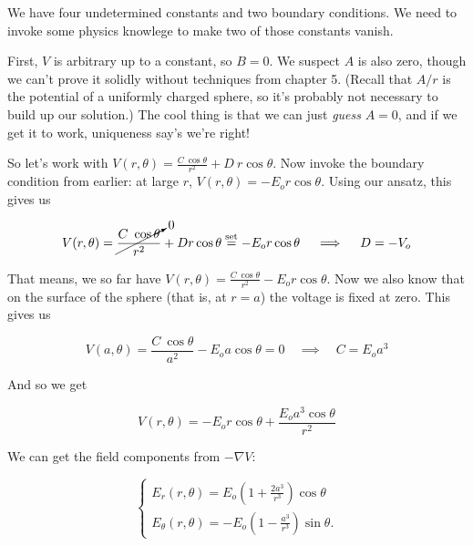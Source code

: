 \documentclass{article}
\begin{document}
\vspace{2em}

We have four undetermined constants and two boundary conditions. We need to invoke some physics knowlege to make two of those constants vanish.

\vspace{1em}

First, $V$ is arbitrary up to a constant, so $B=0$. We suspect $A$ is also zero, though we can't prove it solidly without techniques from chapter 5. (Recall that $A/r$ is the potential of a uniformly charged sphere, so it's probably not necessary to build up our solution.) The cool thing is that we can just \emph{guess} $A=0$, and if we get it to work, uniqueness say's we're right!

\vspace{1em}

So let's work with $\displaystyle V(r,\theta) = \frac{C\ \cos{\theta}}{r^2} + D\ r\cos{\theta}$. Now invoke the boundary condition from earlier: at large $r$, $V(r,\theta) = -E_o r\cos{\theta}$. Using our ansatz, this gives us

\begin{equation*}
    V(r,\theta) = \cancelto{0}{\frac{C\ \cos{\theta}}{r^2}} + D r\cos{\theta} \overset{\text{set}}{=} -E_o r\cos{\theta} \quad \implies \quad D = -V_o
\end{equation*}

That means, we so far have $\displaystyle V(r,\theta) = \frac{C\ \cos{\theta}}{r^2} - E_o r \cos{\theta}$. Now we also know that on the surface of the sphere (that is, at $r = a$) the voltage is fixed at zero. This gives us

\begin{equation*}
    V(a,\theta) = \frac{C\ \cos{\theta}}{a^2} - E_o a \cos{\theta} = 0 \quad \implies \quad C = E_o a^3
\end{equation*}

And so we get

\begin{equation*}
    V(r,\theta) = -E_o r \cos{\theta} + \frac{E_o a^3 \cos{\theta}}{r^2}
\end{equation*}

We can get the field components from $-\nabla V$:

\begin{equation*}
    \begin{cases} E_r (r,\theta) = E_o \left( 1 + \frac{2a^3}{r^3} \right) \cos{\theta} \\[1em] E_{\theta} (r,\theta) = -E_o \left( 1 - \frac{a^3}{r^3} \right) \sin{\theta}. \end{cases}
\end{equation*}
\end{document}
